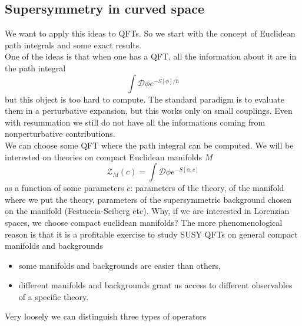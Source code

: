 \documentclass[11pt]{article}
\theoremstyle{definition}
\numberwithin{equation}{section}
\begin{document}
\subsection{Supersymmetry in curved space}
We want to apply this ideas to QFTs. So we start with the concept of Euclidean path integrals and some exact results.\\
One of the ideas is that when one has a QFT, all the information about it are in the path integral
\begin{equation}
	\int \mathcal{D} \phi e^{-S[\phi]/\hbar}
\end{equation}
but this object is too hard to compute. The standard paradigm is to evaluate them in a perturbative expansion, but this works only on small couplings. Even with resummation we still do not have all the informations coming from nonperturbative contributions.\\
We can choose some QFT where the path integral can be computed. We will be interested on theories on compact Euclidean manifolds $M$
\begin{equation}
	\mathcal{Z}_{M}(c) = \int\mathcal{D}\phi e^{-S[\phi,c]}
\end{equation}
as a function of some parameters $c$: parameters of the theory, of the manifold where we put the theory, parameters of the supersymmetric background chosen on the manifold (Festuccia-Seiberg etc). Why, if we are interested in Lorenzian spaces, we choose compact euclidean manifolds? The more phenomenological reason is that it is a profitable exercise to study SUSY QFTs on general compact manifolds and backgrounds
\begin{itemize}
	\item some manifolds and backgrounds are easier than others,\\
	\item different manifolds and backgrounds grant us access to different observables of a specific theory.
\end{itemize}
Very loosely we can distinguish three types of operators 
\end{document}
